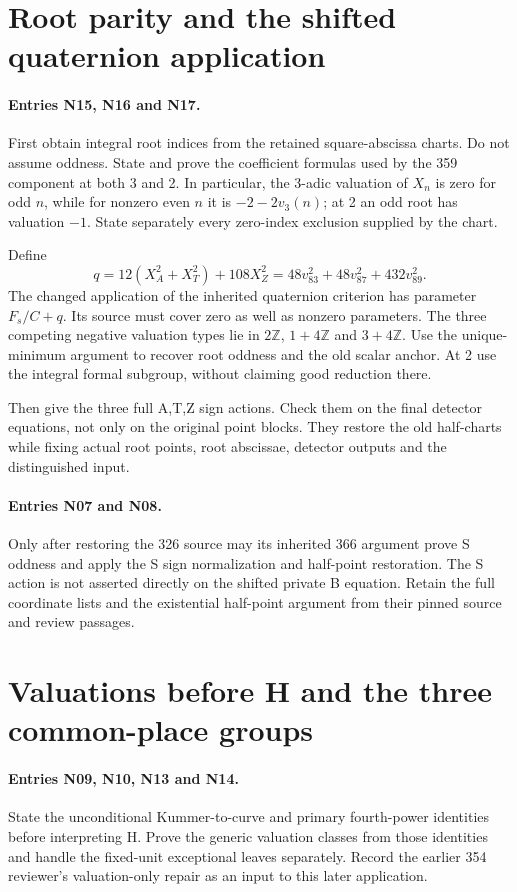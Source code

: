 \documentclass{article}
\begin{document}
\section{Root parity and the shifted quaternion application}
\label{outline:anchor}
\paragraph{Entries N15, N16 and N17.}
First obtain integral root indices from the retained square-abscissa charts.
Do not assume oddness. State and prove the coefficient formulas used by
the 359 component at both 3 and 2. In particular, the 3-adic valuation
of $X_n$ is zero for odd $n$, while for nonzero even $n$ it is
$-2-2v_3(n)$; at 2 an odd root has valuation $-1$.
State separately every zero-index exclusion supplied by the chart.

Define
\[
 q=12(X_A^2+X_T^2)+108X_Z^2
   =48v_{83}^2+48v_{87}^2+432v_{89}^2.
\]
The changed application of the inherited quaternion criterion has
parameter $F_s/C+q$. Its source must cover zero as well as nonzero
parameters. The three competing negative valuation types lie in
$2\mathbb Z$, $1+4\mathbb Z$ and $3+4\mathbb Z$.
Use the unique-minimum argument to recover root oddness and the old
scalar anchor. At 2 use the integral formal subgroup, without claiming
good reduction there.

Then give the three full A,T,Z sign actions. Check them on the final
detector equations, not only on the original point blocks. They restore
the old half-charts while fixing actual root points, root abscissae,
detector outputs and the distinguished input.

\paragraph{Entries N07 and N08.}
Only after restoring the 326 source may its inherited 366 argument prove
S oddness and apply the S sign normalization and half-point restoration.
The S action is not asserted directly on the shifted private B equation.
Retain the full coordinate lists and the existential half-point argument
from their pinned source and review passages.

\section{Valuations before H and the three common-place groups}
\label{outline:detectors}
\paragraph{Entries N09, N10, N13 and N14.}
State the unconditional Kummer-to-curve and primary fourth-power
identities before interpreting H. Prove the generic valuation classes
from those identities and handle the fixed-unit exceptional leaves
separately. Record the earlier 354 reviewer's valuation-only repair
as an input to this later application.
\end{document}
